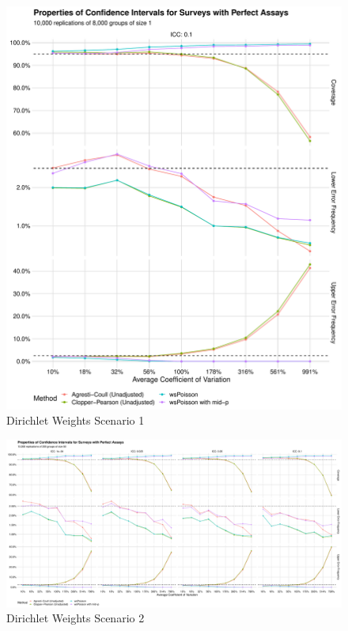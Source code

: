\documentclass{article}
\begin{document}
\begin{figure}
    \centering
    \includegraphics[width=\textwidth]{figures/results_plot_8000_1.pdf}
    \caption{Dirichlet Weights Scenario 1}
    \label{fig:dws1}
\end{figure}

\pagebreak
\begin{landscape}
\begin{figure}
    \centering
    \includegraphics[width = \paperwidth]{figures/results_plot_200_50.pdf}
    \caption{Dirichlet Weights Scenario 2}
    \label{fig:dws2}
\end{figure}
\end{landscape}
\pagebreak
\end{document}
